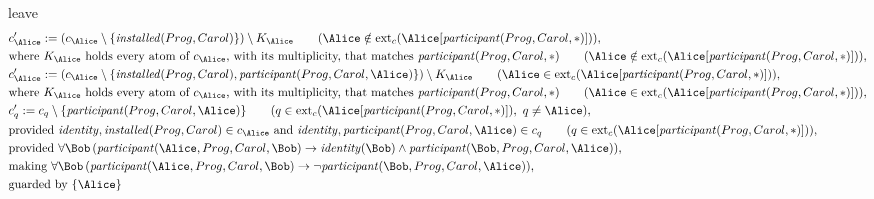 leave
\fi
\begin{align*}
&
c'_
{
\Alice
}
 := 
(c_
{
\Alice
}
 \setminus 
\{
\mathit{
installed
}
(
Prog
,
Carol
)
\}
) \setminus K_
{
\Alice
}
 \qquad (
\Alice
 \notin 
\mathrm{ext}_c(
\Alice
[
\mathit{
participant
}
(
Prog
,
Carol
,
\ast
)
]
)
)
,\\
&
\text{where } K_
{
\Alice
}
 \text{ holds every atom of } c_
{
\Alice
}
 \text{, with its multiplicity, that matches } 
\mathit{
participant
}
(
Prog
,
Carol
,
\ast
)
 \qquad (
\Alice
 \notin 
\mathrm{ext}_c(
\Alice
[
\mathit{
participant
}
(
Prog
,
Carol
,
\ast
)
]
)
)
,\\
&
c'_
{
\Alice
}
 := 
(c_
{
\Alice
}
 \setminus 
\{
\mathit{
installed
}
(
Prog
,
Carol
)
,
\mathit{
participant
}
(
Prog
,
Carol
,
\Alice
)
\}
) \setminus K_
{
\Alice
}
 \qquad (
\Alice
 \in 
\mathrm{ext}_c(
\Alice
[
\mathit{
participant
}
(
Prog
,
Carol
,
\ast
)
]
)
)
,\\
&
\text{where } K_
{
\Alice
}
 \text{ holds every atom of } c_
{
\Alice
}
 \text{, with its multiplicity, that matches } 
\mathit{
participant
}
(
Prog
,
Carol
,
\ast
)
 \qquad (
\Alice
 \in 
\mathrm{ext}_c(
\Alice
[
\mathit{
participant
}
(
Prog
,
Carol
,
\ast
)
]
)
)
,\\
&
c'_
q
 := 
c_
q
 \setminus 
\{
\mathit{
participant
}
(
Prog
,
Carol
,
\Alice
)
\}
 \qquad (
q
 \in 
\mathrm{ext}_c(
\Alice
[
\mathit{
participant
}
(
Prog
,
Carol
,
\ast
)
]
)
,\ 
q \neq 
\Alice
)
,\\
&
\text{provided } 
\mathit{
identity
}
,
\mathit{
installed
}
(
Prog
,
Carol
)
 \in c_
{
\Alice
}
 \text{ and } 
\mathit{
identity
}
,
\mathit{
participant
}
(
Prog
,
Carol
,
\Alice
)
 \in c_
q
 \qquad (
q \in 
\mathrm{ext}_c(
\Alice
[
\mathit{
participant
}
(
Prog
,
Carol
,
\ast
)
]
)
)
,\\
&
\text{provided } 
\forall 
\Bob
\,(
\mathit{
participant
}
(
\Alice
,
Prog
,
Carol
,
\Bob
)
\rightarrow
\mathit{
identity
}
(
\Bob
)
\land
\mathit{
participant
}
(
\Bob
,
Prog
,
Carol
,
\Alice
)
)
,\\
&
\text{making } 
\forall 
\Bob
\,(
\mathit{
participant
}
(
\Alice
,
Prog
,
Carol
,
\Bob
)
\rightarrow
\neg 
\mathit{
participant
}
(
\Bob
,
Prog
,
Carol
,
\Alice
)
)
,\\
&
\text{guarded by } \{
\Alice
\}
\end{align*}
